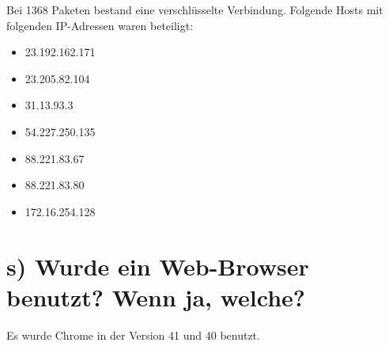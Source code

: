 \documentclass[a4paper, 11pt, fleqn, notitlepage, egregdoesnotlikesansseriftitles]{scrartcl}
\begin{document}
Bei 1368 Paketen bestand eine verschlüsselte Verbindung.
Folgende Hosts mit folgenden IP-Adressen waren beteiligt:
\begin{itemize}
    \item 23.192.162.171
    \item 23.205.82.104
    \item 31.13.93.3
    \item 54.227.250.135
    \item 88.221.83.67
    \item 88.221.83.80
    \item 172.16.254.128
\end{itemize}

\section{s) Wurde ein Web-Browser benutzt? Wenn ja, welche?}
Es wurde Chrome in der Version 41 und 40 benutzt.

\end{document}
